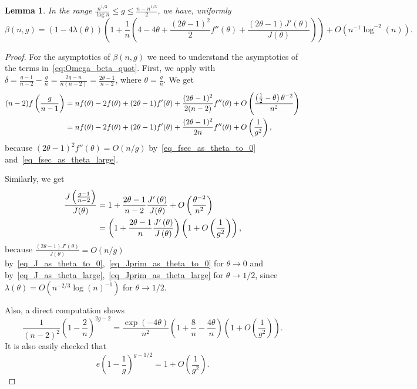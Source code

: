 \documentclass[10pt,a4paper]{amsart}
\newtheorem{lemma}{Lemma}
\newcommand{\bigO}[1]{O\left({#1}\right)}
\newcommand{\bigpar}[1]{\left({#1}\right)}
\newcommand{\err}{\bigO{n^{-1}\log^{-2}(n)}}
\newcommand{\f}[2]{f\left(\frac{#1}{#2}\right)}
\newcommand{\halfminth}{\left(\frac 1 2 -\theta\right)}
\begin{document}
\begin{lemma}\label{lem_beta_intermediate}
In the range $\frac{n^{1/3}}{\log n}\leq g\leq \frac{n-n^{1/3}}{2}$, we have, uniformly
    \[\beta(n,g)=(1-4\lambda(\theta))\left(1+\frac{1}{n}\left(4-4\theta+\frac{(2\theta-1)^2}{2}f''(\theta)+\frac{(2\theta-1)J'\left(\theta\right)}{J\left(\theta\right)}\right)\right)+\err.\]
\end{lemma}

\begin{proof}
For the asymptotics of $\beta(n,g)$ we need to understand the asymptotics of the terms in~\eqref{eq:Omega_beta_quot}. 
First, we apply  with $\delta=\frac{g-1}{n-2}-\frac{g}{n}=\frac{2g-n}{n(n-2)}=\frac{2\theta-1}{n-2}$, where $\theta=\frac{g}{n}$. We get
\begin{align}
(n-2)\f{g}{n-1}&=nf(\theta)-2f(\theta)+(2\theta-1)f'(\theta)+\frac{(2\theta-1)^2}{2(n-2)}f''(\theta)+\bigO{\frac{\halfminth\theta^{-2}}{n^2}}\notag\\
&=nf(\theta)-2f(\theta)+(2\theta-1)f'(\theta)+\frac{(2\theta-1)^2}{2n}f''(\theta)+\bigO{\frac{1}{g^2}},\label{bbb1}
\end{align}
because  $(2\theta-1)^2f''(\theta)=O(n/g)$ by~\eqref{eq_fsec_as_theta_to_0} and~\eqref{eq_fsec_as_theta_large}. 


Similarly, we get
\begin{align}
\frac{J\left(\frac{g-1}{n-2}\right)}{J(\theta)}&=1+\frac{2\theta-1}{n-2}\frac{J'\left(\theta\right)}{J(\theta)}+\bigO{\frac{\theta^{-2}}{n^2}}\notag\\
&=\bigpar{1+\frac{2\theta-1}{n}\frac{J'\left(\theta\right)}{J\left(\theta\right)}}\bigpar{1+\bigO{\frac{1}{g^2}}},\label{bbb2}
\end{align}
because  $\frac{(2\theta-1) J'(\theta)}{J(\theta)}=O(n/g)$ 
by~\eqref{eq_J_as_theta_to_0},~\eqref{eq_Jprim_as_theta_to_0} for $\theta\to 0$ and by~\eqref{eq_J_as_theta_large},~\eqref{eq_Jprim_as_theta_large} for $\theta\to1/2$, since
 $\lambda(\theta)=O(n^{-2/3} \log(n)^{-1})$ for $\theta\to1/2$.


Also, a direct computation shows
\begin{equation}\label{bbb3}
   \frac{1}{(n-2)^2}\left(1-\frac{2}{n}\right)^{2g-2}
   =\frac{\exp(-4\theta)}{n^2}\left(1+\frac{8}{n}-\frac{4\theta}{n}\right)\bigpar{1+\bigO{\frac{1}{g^2}}}.
\end{equation}
It is also easily checked that 
\[
    e\left(1-\frac{1}{g}\right)^{g-1/2} = 1+\bigO{\frac{1}{g^2}}.
\]


\end{proof}
\end{document}
